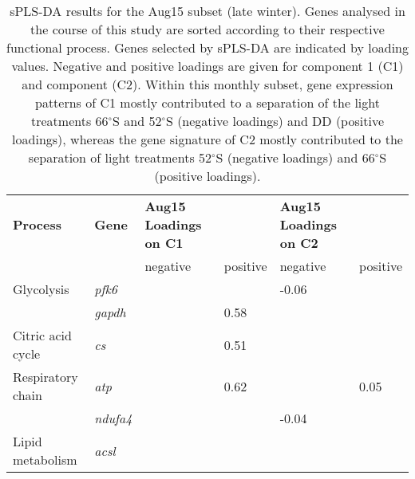 \begin{table}[]
\caption{sPLS-DA results for the Aug15 subset (late winter). Genes analysed in
        the course of this study are sorted according to their respective
        functional process. Genes selected by sPLS-DA are indicated by loading
        values. Negative and positive loadings are given for component 1 (C1)
        and component (C2). Within this monthly subset, gene expression
        patterns of C1 mostly contributed to a separation of the light
        treatments 66$^{\circ}$S and 52$^{\circ}$S (negative loadings) and DD
        (positive loadings), whereas the gene signature of C2 mostly
        contributed to the separation of light treatments 52$^{\circ}$S
        (negative loadings) and 66$^{\circ}$S (positive loadings).}
\label{pub3_tab6}
\begin{tabular}{@{}llllll@{}}
\toprule
\textbf{Process}                      & \textbf{Gene}   & \textbf{Aug15 Loadings on C1} &                & \textbf{Aug15 Loadings on C2} &          \\
                                      &                 & negative                      & positive       & negative                      & positive \\ \midrule
Glycolysis                            & \textit{pfk6}   & \cellcolor[HTML]{C0C0C0}      &                & \cellcolor[HTML]{C0C0C0}-0.06 &          \\
                                      & \textit{gapdh}  & \cellcolor[HTML]{C0C0C0}      & 0.58           & \cellcolor[HTML]{C0C0C0}      &          \\
Citric acid cycle                     & \textit{cs}     & \cellcolor[HTML]{C0C0C0}      & 0.51           & \cellcolor[HTML]{C0C0C0}      &          \\
Respiratory chain                     & \textit{atp}    & \cellcolor[HTML]{C0C0C0}      & 0.62           & \cellcolor[HTML]{C0C0C0}      & 0.05     \\
                                      & \textit{ndufa4} & \cellcolor[HTML]{C0C0C0}      &                & \cellcolor[HTML]{C0C0C0}-0.04 &          \\
Lipid metabolism                      & \textit{acsl}   & \cellcolor[HTML]{C0C0C0}      &                & \cellcolor[HTML]{C0C0C0}      &          \\

\end{tabular}
\end{table}
